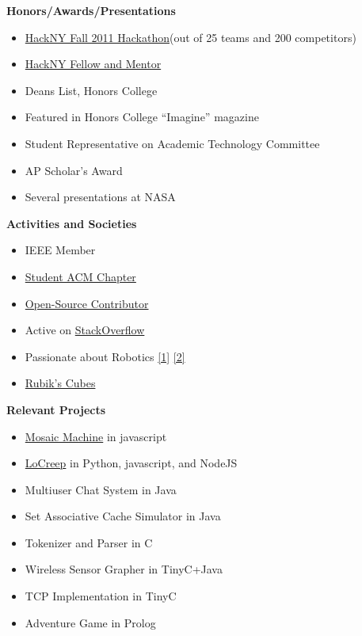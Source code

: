 \documentclass[letterpaper,11pt]{article}
\newcommand{\resitem}[1]{\item #1 \vspace{-2pt}}
\newcommand{\resheading}[1]{{\large \colorbox{mygrey}{\begin{minipage}{\textwidth}{\textbf{#1 \vphantom{p\^{E}}}}\end{minipage}}}}
\begin{document}
\resheading{Honors/Awards/Presentations}
\begin{itemize}
   \resitem{\href{http://www.youtube.com/watch?v=ga6RPRAFRUY}{HackNY Fall 2011 Hackathon}(out of 25 teams and 200 competitors)}
   \resitem{\href{http://hackny.org/a/about/}{HackNY Fellow and Mentor}}
   \resitem{Deans List, Honors College}
   \resitem{Featured in Honors College ``Imagine'' magazine}
   \resitem{Student Representative on Academic Technology Committee}
   \resitem{AP Scholar's Award}
   \resitem{Several presentations at NASA}
\end{itemize}
\resheading{Activities and Societies}
\begin{itemize}
   \resitem{IEEE Member}
   \resitem{\href{http://polaris.cs.wcu.edu/~acm/}{Student ACM Chapter}}
   \resitem{\href{https://github.com/ranman}{Open-Source Contributor}}
   \resitem{Active on \href{http://stackoverflow.com/users/240004/ranman}{StackOverflow}}
   \resitem{Passionate about Robotics
      \href{http://robotics.punahou.edu/}{[1]}
      \href{http://irg.arc.nasa.gov}{[2]}}
   \resitem{\href{http://www.youtube.com/user/ranman96734}{Rubik's Cubes}}
\end{itemize}
\resheading{Relevant Projects}
\begin{itemize}
   \resitem{\href{http://www.mosaicmachine.com/}{Mosaic Machine} in javascript}
   \resitem{\href{http://www.locreep.com/}{LoCreep} in Python, javascript, and NodeJS}
   \resitem{Multiuser Chat System in Java}
   \resitem{Set Associative Cache Simulator in Java}
   \resitem{Tokenizer and Parser in C}
   \resitem{Wireless Sensor Grapher in TinyC+Java}
   \resitem{TCP Implementation in TinyC}
   \resitem{Adventure Game in Prolog}
\end{itemize}
\end{document}

